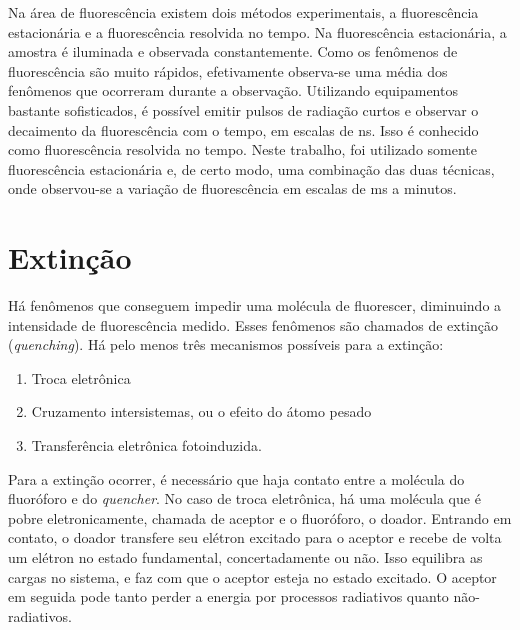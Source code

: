 		Na área de fluorescência existem dois métodos experimentais, a fluorescência estacionária e a fluorescência resolvida no tempo. Na fluorescência estacionária, a amostra é iluminada e observada constantemente. Como os fenômenos de fluorescência são muito rápidos, efetivamente observa-se uma média dos fenômenos que ocorreram durante a observação. Utilizando equipamentos bastante sofisticados, é possível emitir pulsos de radiação curtos e observar o decaimento da fluorescência com o tempo, em escalas de ns. Isso é conhecido como fluorescência resolvida no tempo. Neste trabalho, foi utilizado somente fluorescência estacionária e, de certo modo, uma combinação das duas técnicas, onde observou-se a variação de fluorescência em escalas de ms a minutos.
		
		
		\section{Extinção} 
		
		Há fenômenos que conseguem impedir uma molécula de fluorescer, diminuindo a intensidade de fluorescência medido. Esses fenômenos são chamados de extinção (\emph{quenching}). Há pelo menos três mecanismos possíveis para a extinção:
		
		\begin{enumerate}[noitemsep]
			\item Troca eletrônica
			\item Cruzamento intersistemas, ou o efeito do átomo pesado
			\item Transferência eletrônica fotoinduzida.
		\end{enumerate}
		
		Para a extinção ocorrer, é necessário que haja contato entre a molécula do fluoróforo e do \emph{quencher}.  No caso de troca eletrônica, há uma molécula que é pobre eletronicamente, chamada de aceptor e o fluoróforo, o doador. Entrando em contato, o doador transfere seu elétron excitado para o aceptor e recebe de volta um elétron no estado fundamental, concertadamente ou não. Isso equilibra as cargas no sistema, e faz com que o aceptor esteja no estado excitado. O aceptor em seguida pode tanto perder a energia por processos radiativos quanto não-radiativos. %
		
